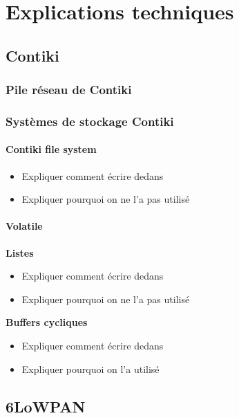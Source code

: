 \chapter{Explications techniques}
\label{sec:technique}

\section{Contiki}

	\subsection{Pile réseau de Contiki}
	
	\subsection{Systèmes de stockage Contiki}
	
		\subsubsection{Contiki file system}
			\begin{itemize}
				\item Expliquer comment écrire dedans
				\item Expliquer pourquoi on ne l'a pas utilisé
			\end{itemize}
		\subsubsection{Volatile}
			\noindent\textbf{Listes}
			\begin{itemize}
				\item Expliquer comment écrire dedans
				\item Expliquer pourquoi on ne l'a pas utilisé
			\end{itemize}
			\textbf{Buffers cycliques}
			\begin{itemize}
				\item Expliquer comment écrire dedans
				\item Expliquer pourquoi on l'a utilisé
			\end{itemize}
		
	
\section{6LoWPAN}
